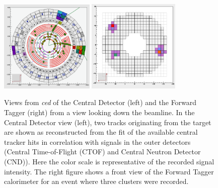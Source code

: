 \begin{figure}
\centering
\includegraphics[width=0.4\textwidth]{pics/ced_central.png}
\includegraphics[width=0.39\textwidth]{pics/ced_ft.png}
\caption{Views from {\it ced} of the Central Detector (left) and the Forward Tagger (right) from a view looking
  down the beamline. In the Central Detector view (left), two tracks originating from the target are shown as
  reconstructed from the fit of the available central tracker hits in correlation with signals in the outer detectors
  (Central Time-of-Flight (CTOF) and Central Neutron Detector (CND)). Here the color scale is representative of
  the recorded signal intensity. The right figure shows a front view of the Forward Tagger calorimeter for an event
  where three clusters were recorded.}
\label{fig:ced}
\end{figure}
